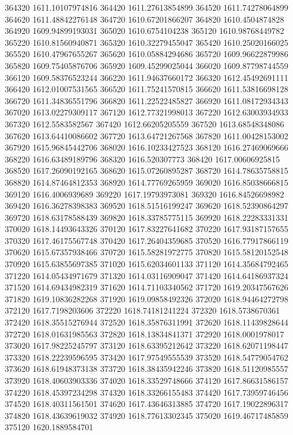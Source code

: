 {364320 1611.10107974816
364420 1611.27613854899
364520 1611.74278064899
364620 1611.48842276148
364720 1610.67201866207
364820 1610.4504874828
364920 1609.94899193031
365020 1610.6754104238
365120 1610.98768449782
365220 1610.81560940871
365320 1610.32279455047
365420 1610.25020166025
365520 1610.47967655267
365620 1610.05884294686
365720 1609.96622879986
365820 1609.75405876706
365920 1609.45299025044
366020 1609.87798744559
366120 1609.58376523244
366220 1611.94637660172
366320 1612.45492691111
366420 1612.01007531565
366520 1611.75241570815
366620 1611.53816698128
366720 1611.34836551796
366820 1611.22522485827
366920 1611.08172934343
367020 1613.02279309117
367120 1612.77321998013
367220 1612.63003934933
367320 1612.5583582567
367420 1612.66205205559
367520 1613.68548348086
367620 1613.64410086602
367720 1613.64721267568
367820 1611.00428153002
367920 1615.96845442706
368020 1616.10233427523
368120 1616.27469069666
368220 1616.63489189796
368320 1616.520307773
368420 1617.00606925815
368520 1617.26090192165
368620 1615.07260895287
368720 1614.78635758815
368820 1614.87464812353
368920 1614.77769265959
369020 1616.85038666815
369120 1616.4006939689
369220 1617.19793973081
369320 1616.84526698982
369420 1616.36278398383
369520 1618.51516199247
369620 1618.52390864297
369720 1618.63178588439
369820 1618.33785775115
369920 1618.22283331331
370020 1618.14493643326
370120 1617.83227641682
370220 1617.93187157655
370320 1617.46175567748
370420 1617.26404359685
370520 1616.77917866119
370620 1615.67357938466
370720 1615.58281972775
370820 1615.58120152548
370920 1615.63855697385
371020 1615.62034601133
371120 1614.35684792465
371220 1614.05434971679
371320 1614.03116909047
371420 1614.64186937324
371520 1614.69434982319
371620 1614.71103340562
371720 1619.20347567626
371820 1619.10836282268
371920 1619.09858492326
372020 1618.94464272798
372120 1617.7198203606
372220 1618.74181241224
372320 1618.5738670361
372420 1618.35515276944
372520 1618.35876311991
372620 1618.11439828644
372720 1618.01631985563
372820 1618.13834841371
372920 1618.0001978017
373020 1617.98225245797
373120 1618.63395212642
373220 1618.62071198447
373320 1618.22239596595
373420 1617.97549555539
373520 1618.54779054762
373620 1618.61948373138
373720 1618.38435942246
373820 1618.51120985557
373920 1618.40603903336
374020 1618.33529748666
374120 1617.86631586157
374220 1618.45397234298
374320 1618.33266155483
374420 1617.73959746456
374520 1618.40311561501
374620 1617.43646313885
374720 1617.19022896317
374820 1618.43639619032
374920 1618.77613302345
375020 1619.46717485859
375120 1620.1889584701
}
